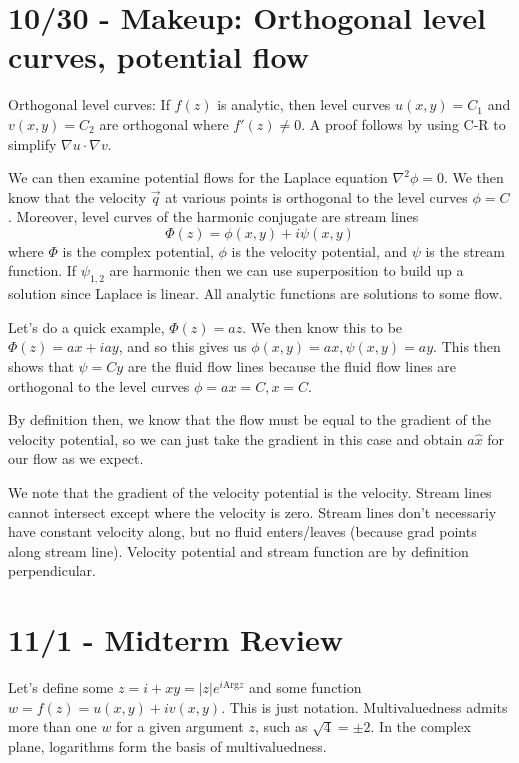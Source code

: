 \documentclass[10pt]{report}
\newcommand{\abs}[1]{\left|#1\right|}
\newcommand{\Arg}[0]{\mathrm{Arg} }
\begin{document}
\chapter{10/30 - Makeup: Orthogonal level curves, potential flow}

Orthogonal level curves: If $f(z)$ is analytic, then level curves $u(x,y) = C_1$ and $v(x,y) = C_2$ are orthogonal where $f'(z) \neq 0$. A proof follows by using C-R to simplify $\nabla u \cdot \nabla v$.

We can then examine potential flows for the Laplace equation $\nabla^2 \phi = 0$. We then know that the velocity $\vec{q}$ at various points is orthogonal to the level curves $\phi = C$. Moreover, level curves of the harmonic conjugate are stream lines
$$\Phi(z) = \phi(x,y) + i\psi(x,y)$$
where $\Phi$ is the complex potential, $\phi$ is the velocity potential, and $\psi$ is the stream function. If $\psi_{1,2}$ are harmonic then we can use superposition to build up a solution since Laplace is linear. All analytic functions are solutions to some flow.

Let's do a quick example, $\Phi(z) = az$. We then know this to be $\Phi(z) = ax + iay$, and so this gives us $\phi(x,y) = ax, \psi(x,y) = ay$. This then shows that $\psi = Cy$ are the fluid flow lines because the fluid flow lines are orthogonal to the level curves $\phi = ax = C, x = C$. 

By definition then, we know that the flow must be equal to the gradient of the velocity potential, so we can just take the gradient in this case and obtain $a\hat{x}$ for our flow as we expect. 

We note that the gradient of the velocity potential is the velocity. Stream lines cannot intersect except where the velocity is zero. Stream lines don't necessariy have constant velocity along, but no fluid enters/leaves (because grad points along stream line). Velocity potential and stream function are by definition perpendicular.

\chapter{11/1 - Midterm Review}

Let's define some $z = i+xy = \abs{z}e^{i\Arg z}$ and some function $w = f(z) = u(x,y) + iv(x,y)$. This is just notation. Multivaluedness admits more than one $w$ for a given argument $z$, such as $\sqrt{4} = \pm 2$. In the complex plane, logarithms form the basis of multivaluedness.
\end{document}
